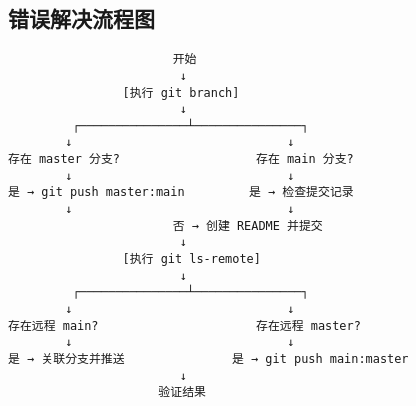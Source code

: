 \subsection{错误解决流程图}
\begin{verbatim}
                       开始
                        ↓
                [执行 git branch]
                        ↓
         ┌───────────────┴───────────────┐
        ↓                              ↓
存在 master 分支?                   存在 main 分支?
        ↓                              ↓
是 → git push master:main         是 → 检查提交记录
        ↓                              ↓
                       否 → 创建 README 并提交
                        ↓
                [执行 git ls-remote]
                        ↓
         ┌───────────────┴───────────────┐
        ↓                              ↓
存在远程 main?                      存在远程 master?
        ↓                              ↓
是 → 关联分支并推送               是 → git push main:master
                        ↓
                     验证结果
\end{verbatim}



